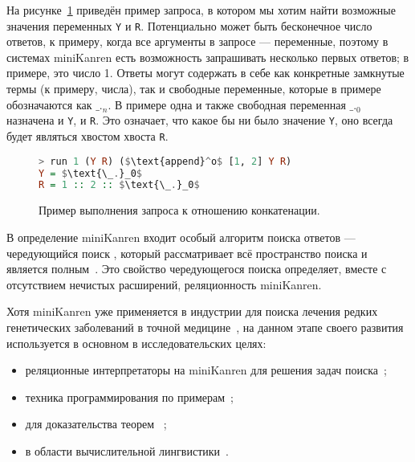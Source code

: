 На рисунке~\ref{fig:appendoExample} приведён пример запроса, в котором мы хотим
найти возможные значения переменных \lstinline{Y} и \lstinline{R}. Потенциально
может быть бесконечное число ответов, к примеру, когда все аргументы в запросе
--- переменные, поэтому в системах miniKanren есть возможность запрашивать
несколько первых ответов; в примере, это число 1. Ответы могут содержать в себе
как конкретные замкнутые термы (к примеру, числа), так и свободные переменные,
которые в примере обозначаются как $\text{\_.}_n$. В примере одна и также
свободная переменная $\text{\_.}_0$ назначена и \lstinline{Y}, и \lstinline{R}.
Это означает, что какое бы ни было значение \lstinline{Y}, оно всегда будет
являться хвостом хвоста \lstinline{R}.

\begin{figure}[h!]
\begin{lstlisting}[mathescape,language=Haskell,extendedchars=\true,frame=single,basicstyle=\ttfamily]
> run 1 (Y R) ($\text{append}^o$ [1, 2] Y R)
Y = $\text{\_.}_0$
R = 1 :: 2 :: $\text{\_.}_0$
\end{lstlisting}
\caption{Пример выполнения запроса к отношению конкатенации.}
\label{fig:appendoExample}
\end{figure}

В определение miniKanren входит особый алгоритм поиска ответов --- чередующийся
поиск , %
который рассматривает всё пространство поиска и является
полным~\cite{interleaving}.
Это свойство чередующегося поиска определяет, вместе с отсутствием
нечистых расширений, реляционность miniKanren. 

Хотя miniKanren уже применяется в индустрии для поиска лечения редких
генетических заболеваний в точной медицине~\cite{medMK},
на данном этапе своего развития используется в основном в исследовательских
целях:
\begin{itemize}
\item реляционные интерпретаторы на miniKanren для решения задач поиска~\cite{lozov};
\item техника программирования по примерам~\cite{unifiedMK};
\item для доказательства теорем~\cite{mkProver} ;
\item в области вычислительной лингвистики~\cite{mkLing}.
\end{itemize}

